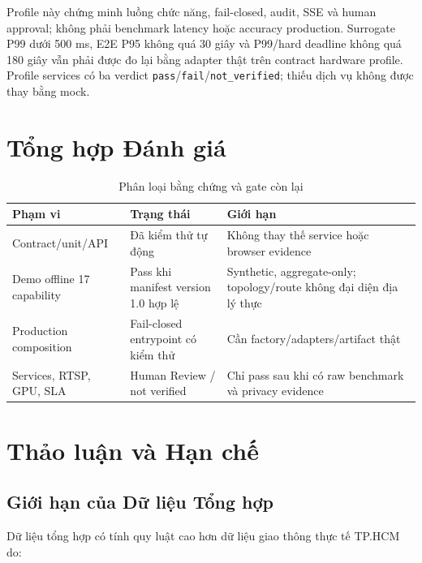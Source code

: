 Profile này chứng minh luồng chức năng, fail-closed, audit, SSE và human approval;
không phải benchmark latency hoặc accuracy production. Surrogate P99 dưới 500 ms,
E2E P95 không quá 30 giây và P99/hard deadline không quá 180 giây vẫn phải được
đo lại bằng adapter thật trên contract hardware profile. Profile services có
ba verdict \texttt{pass}/\texttt{fail}/\texttt{not\_verified}; thiếu dịch vụ
không được thay bằng mock.

\section{Tổng hợp Đánh giá}

\begin{table}[H]
\centering
\caption{Phân loại bằng chứng và gate còn lại}
\label{tab:evidence_summary_verified}
\begin{tabular}{p{4cm} p{3cm} p{5.2cm}}
\toprule
\textbf{Phạm vi} & \textbf{Trạng thái} & \textbf{Giới hạn} \\
\midrule
Contract/unit/API & Đã kiểm thử tự động & Không thay thế service hoặc browser evidence \\
\rowcolor{rowgray}
Demo offline 17 capability & Pass khi manifest version 1.0 hợp lệ & Synthetic, aggregate-only; topology/route không đại diện địa lý thực \\
Production composition & Fail-closed entrypoint có kiểm thử & Cần factory/adapters/artifact thật \\
\rowcolor{rowgray}
Services, RTSP, GPU, SLA & Human Review / not verified & Chỉ pass sau khi có raw benchmark và privacy evidence \\
\bottomrule
\end{tabular}
\end{table}

\section{Thảo luận và Hạn chế}
\label{sec:eval_discussion}

\subsection{Giới hạn của Dữ liệu Tổng hợp}

Dữ liệu tổng hợp có tính quy luật cao hơn dữ liệu giao thông thực tế TP.HCM do:

